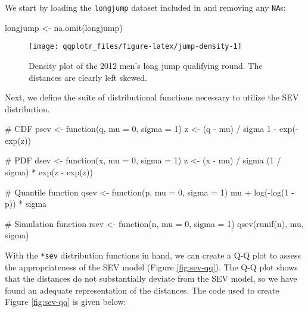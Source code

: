 We start by loading the \texttt{longjump} dataset included in
 and removing any \texttt{NA}s:

\begin{Schunk}
\begin{Sinput}
longjump <- na.omit(longjump)
\end{Sinput}
\end{Schunk}

\begin{Schunk}
\begin{figure}

{\centering \texttt{[image: qqplotr\_files/figure-latex/jump-density-1]} 

}

\caption[Density plot of the 2012 men's long jump qualifying round]{Density plot of the 2012 men's long jump qualifying round. The distances are clearly left skewed.}\label{fig:jump-density}
\end{figure}
\end{Schunk}

Next, we define the suite of distributional functions necessary to
utilize the SEV distribution.

\begin{Schunk}
\begin{Sinput}
# CDF
psev <- function(q, mu = 0, sigma = 1) {
  z <- (q - mu) / sigma
  1 - exp(-exp(z))
}

# PDF
dsev <- function(x, mu = 0, sigma = 1) {
  z <- (x - mu) / sigma
  (1 / sigma) * exp(z - exp(z))
}

# Quantile function
qsev <- function(p, mu = 0, sigma = 1) {
  mu + log(-log(1 - p)) * sigma
}

# Simulation function
rsev <- function(n, mu = 0, sigma = 1) {
  qsev(runif(n), mu, sigma)
}
\end{Sinput}
\end{Schunk}

With the \texttt{*sev} distribution functions in hand, we can create a
Q-Q plot to assess the appropriateness of the SEV model (Figure
\ref{fig:sev-qq}). The Q-Q plot shows that the distances do not
substantially deviate from the SEV model, so we have found an adequate
representation of the distances. The code used to create Figure
\ref{fig:sev-qq} is given below:

